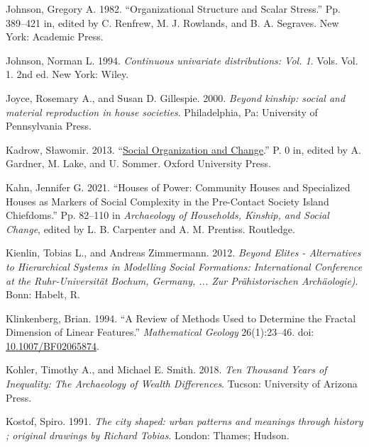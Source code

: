 \documentclass[
  12pt,
]{book}
\newlength{\cslhangindent}
\newlength{\cslentryspacingunit} %
\newenvironment{CSLReferences}[2] %
 {%
  \setlength{\parindent}{0pt}
  \ifodd #1
  \let\oldpar\par
  \def\par{\hangindent=\cslhangindent\oldpar}
  \fi
  \setlength{\parskip}{#2\cslentryspacingunit}
 }%
 {}
\begin{document}
\begin{CSLReferences}{1}{0}
\leavevmode{}%
Johnson, Gregory A. 1982. {``Organizational Structure and Scalar Stress.''} Pp. 389--421 in, edited by C. Renfrew, M. J. Rowlands, and B. A. Segraves. New York: Academic Press.

\leavevmode{}%
Johnson, Norman L. 1994. \emph{Continuous univariate distributions: Vol. 1}. Vols. Vol. 1. 2nd ed. New York: Wiley.

\leavevmode{}%
Joyce, Rosemary A., and Susan D. Gillespie. 2000. \emph{Beyond kinship: social and material reproduction in house societies}. Philadelphia, Pa: University of Pennsylvania Press.

\leavevmode{}%
Kadrow, Sławomir. 2013. {``\href{https://doi.org/10.1093/oxfordhb/9780199567942.013.023}{Social Organization and Change}.''} P. 0 in, edited by A. Gardner, M. Lake, and U. Sommer. Oxford University Press.

\leavevmode{}%
Kahn, Jennifer G. 2021. {``Houses of Power: {Community} Houses and Specialized Houses as Markers of Social Complexity in the Pre-Contact {Society Island} Chiefdoms.''} Pp. 82--110 in \emph{Archaeology of {Households}, {Kinship}, and {Social Change}}, edited by L. B. Carpenter and A. M. Prentiss. {Routledge}.

\leavevmode{}%
Kienlin, Tobias L., and Andreas Zimmermann. 2012. \emph{Beyond Elites - Alternatives to Hierarchical Systems in Modelling Social Formations: International Conference at the Ruhr-Universität Bochum, Germany, ... Zur Prähistorischen Archäologie)}. Bonn: Habelt, R.

\leavevmode{}%
Klinkenberg, Brian. 1994. {``A Review of Methods Used to Determine the Fractal Dimension of Linear Features.''} \emph{Mathematical Geology} 26(1):23--46. doi: \href{https://doi.org/10.1007/BF02065874}{10.1007/BF02065874}.

\leavevmode{}%
Kohler, Timothy A., and Michael E. Smith. 2018. \emph{Ten Thousand Years of Inequality: The Archaeology of Wealth Differences}. Tucson: University of Arizona Press.

\leavevmode{}%
Kostof, Spiro. 1991. \emph{The city shaped: urban patterns and meanings through history ; original drawings by Richard Tobias}. London: Thames; Hudson.


\end{CSLReferences}
\end{document}
